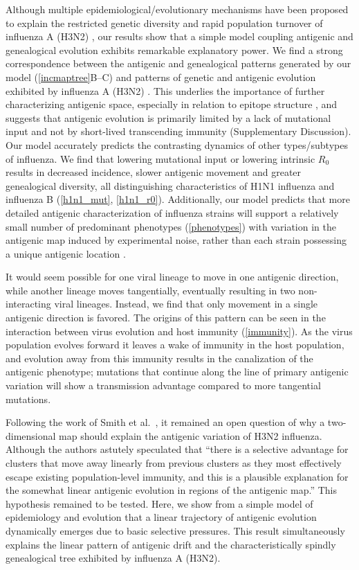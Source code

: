 Although multiple epidemiological/evolutionary mechanisms have been proposed to explain the restricted genetic diversity and rapid population turnover of influenza A (H3N2) \cite{Ferguson03,Tria05,Koelle06,Recker07}, our results show that a simple model coupling antigenic and genealogical evolution exhibits remarkable explanatory power.  We find a strong correspondence between the antigenic and genealogical patterns generated by our model (\ref{incmaptree}B--C) and patterns of genetic and antigenic evolution exhibited by influenza A (H3N2) \cite{Fitch97,Smith04}.  This underlies the importance of further characterizing antigenic space, especially in relation to epitope structure \cite{Recker07}, and suggests that antigenic evolution is primarily limited by a lack of mutational input and not by short-lived transcending immunity (Supplementary Discussion).  Our model accurately predicts the contrasting dynamics of other types/subtypes of influenza.  We find that lowering mutational input or lowering intrinsic $R_0$ results in decreased incidence, slower antigenic movement and greater genealogical diversity, all distinguishing characteristics of H1N1 influenza and influenza B (\ref{h1n1_mut}, \ref{h1n1_r0}).  Additionally, our model predicts that more detailed antigenic characterization of influenza strains will support a relatively small number of predominant phenotypes (\ref{phenotypes}) with variation in the antigenic map induced by experimental noise, rather than each strain possessing a unique antigenic location \cite{Smith04}.

It would seem possible for one viral lineage to move in one antigenic direction, while another lineage moves tangentially, eventually resulting in two non-interacting viral lineages.  Instead, we find that only movement in a single antigenic direction is favored.  The origins of this pattern can be seen in the interaction between virus evolution and host immunity (\ref{immunity}).  As the virus population evolves forward it leaves a wake of immunity in the host population, and evolution away from this immunity results in the canalization of the antigenic phenotype; mutations that continue along the line of primary antigenic variation will show a transmission advantage compared to more tangential mutations.  

Following the work of Smith et al.\ \cite{Smith04}, it remained an open question of why a two-dimensional map should explain the antigenic variation of H3N2 influenza.  Although the authors astutely speculated that ``there is a selective advantage for clusters that move away linearly from previous clusters as they most effectively escape existing population-level immunity, and this is a plausible explanation for the somewhat linear antigenic evolution in regions of the antigenic map.''  This hypothesis remained to be tested.  Here, we show from a simple model of epidemiology and evolution that a linear trajectory of antigenic evolution dynamically emerges due to basic selective pressures.  This result simultaneously explains the linear pattern of antigenic drift \cite{Smith04} and the characteristically spindly genealogical tree \cite{Fitch97} exhibited by influenza A (H3N2).

